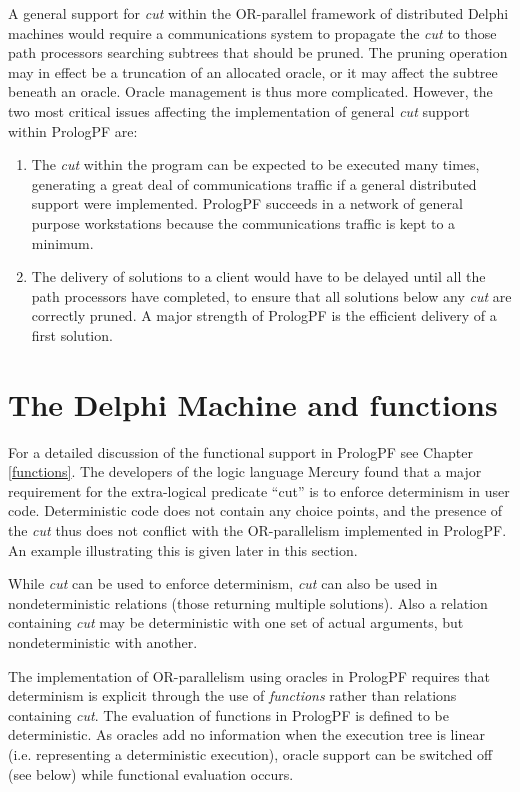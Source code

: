 A general support for \textit{cut} within the OR-parallel framework of distributed
Delphi machines would require a communications system to propagate the \textit{cut} to
those path processors searching subtrees that should be pruned.
The pruning operation may in effect be a truncation
of an allocated oracle,
or it may affect the subtree beneath an oracle.  Oracle management is thus more complicated.
However, the two most critical issues affecting the implementation of general \textit{cut}
support within PrologPF are:
\begin{enumerate}
\item{The \textit{cut} within the program can be expected to be executed many times,
  generating a great deal of communications traffic if a general distributed support were
  implemented.  PrologPF succeeds in a network of general purpose workstations because
  the communications traffic is kept to a minimum.}
\item{The delivery of solutions to a client would have to be delayed until all the
  path processors have completed, to ensure that all solutions below any \textit{cut}
  are correctly pruned.  A major strength of PrologPF is the efficient delivery
  of a first solution.}
\end{enumerate}


\section{The Delphi Machine and functions} %

For a detailed discussion of the functional support in PrologPF see
Chapter \ref{functions}.
The developers of the logic language Mercury \cite{SHC95,HCSR95}
 found that a major requirement for the
extra-logical predicate ``cut'' is to enforce determinism in user code.
Deterministic code does not contain any choice points, and the presence of the 
\textit{cut} thus does not conflict with the OR-parallelism implemented in
PrologPF.  An example illustrating this is given later in this section.

While \textit{cut} can be used to enforce determinism, \textit{cut} can also be
used in nondeterministic relations (those returning multiple solutions).  Also
a relation containing \textit{cut} may be deterministic with one set of actual
arguments, but nondeterministic with another.

The implementation of OR-parallelism using oracles in PrologPF requires that
determinism is explicit through the use of \textit{functions} rather than
relations containing \textit{cut}.  The evaluation of functions in PrologPF
is defined to be deterministic.  As oracles add no information when the execution tree
is linear
(i.e. representing a deterministic execution), oracle support can be switched off
(see below) while functional evaluation occurs.

